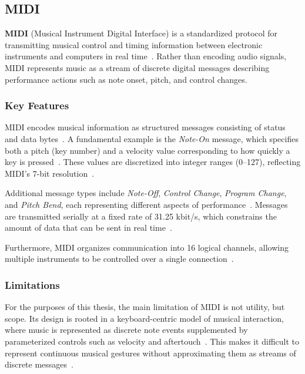 \subsection{MIDI}\label{subsec:midi}

\textbf{MIDI} (Musical Instrument Digital Interface) is a standardized protocol for transmitting musical control and
timing information between electronic instruments and computers in real time~\cite{Moog_1986}.
Rather than encoding audio signals, MIDI represents music as a stream of discrete digital messages describing
performance actions such as note onset, pitch, and control changes.


\subsubsection{Key Features}

MIDI encodes musical information as structured messages consisting of status and data bytes~\cite{Moog_1986}.
A fundamental example is the \textit{Note-On} message, which specifies both a pitch (key number) and a velocity value
corresponding to how quickly a key is pressed~\cite{Moog_1986}.
These values are discretized into integer ranges (0–127), reflecting MIDI’s 7-bit resolution~\cite{Moog_1986}.

Additional message types include \textit{Note-Off}, \textit{Control Change}, \textit{Program Change}, and
\textit{Pitch Bend}, each representing different aspects of performance~\cite{Moog_1986}.
Messages are transmitted serially at a fixed rate of 31.25 kbit/s, which constrains the amount of data that can be sent
in real time~\cite{Moog_1986}.

Furthermore, MIDI organizes communication into 16 logical channels, allowing multiple instruments to be controlled over
a single connection~\cite{Moog_1986}.


\subsubsection{Limitations}

For the purposes of this thesis, the main limitation of MIDI is not utility, but scope.
Its design is rooted in a keyboard-centric model of musical interaction, where music is represented as discrete note
events supplemented by parameterized controls such as velocity and aftertouch~\cite{Moore_1988}.
This makes it difficult to represent continuous musical gestures without approximating them as streams of discrete
messages~\cite{Moore_1988}.

